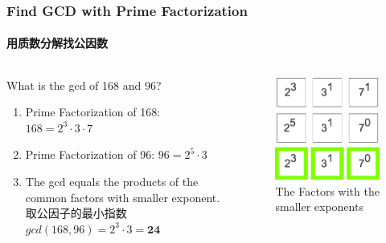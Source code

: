 \documentclass[
	11pt, %
]{beamer}
\begin{document}
\begin{frame}	
	\frametitle{Find GCD with Prime Factorization}
	\framesubtitle{用质数分解找公因数}
		\begin{columns}[t] %
			\begin{column}{0.45\textwidth} %
				What is the gcd of 168 and 96?
			 \begin{enumerate}
			 	\item Prime Factorization of 168: $168=2^3 \cdot 3 \cdot 7$
			 	\item Prime Factorization of 96: $96=2^5 \cdot 3$
			 	\item The gcd equals the products of the common factors with smaller exponent.\\ 取公因子的最小指数 \\ $gcd(168, 96) = 2^3 \cdot 3 = \textbf{24}$
			 	\end{enumerate}

			\end{column}
			\begin{column}{0.5\textwidth} %
			\begin{figure}
			\includegraphics[width=0.8\linewidth]{168_96_GCD.png}
			\caption{The Factors with the smaller exponents}
		\end{figure}
			
			\end{column}
		\end{columns}
\end{frame}
\end{document}
